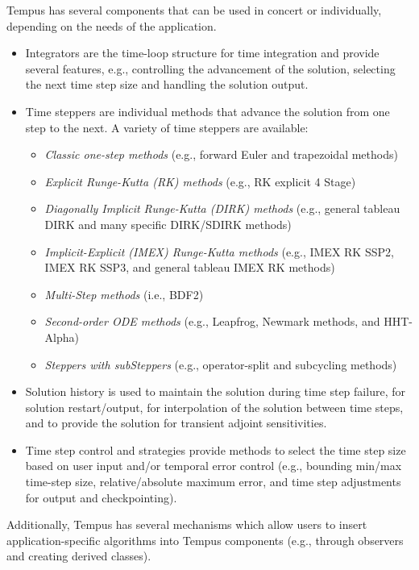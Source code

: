 Tempus has several components that can be used in concert or
individually, depending on the needs of the application.
\begin{itemize}
  \item Integrators are the time-loop structure for time integration
  and provide several features, e.g., controlling the advancement of
  the solution, selecting the next time step size and handling the
  solution output.

  \item Time steppers are individual methods that advance the
  solution from one step to the next.  A variety of time steppers
  are available:
  \begin{itemize}
    \item \emph{Classic one-step methods} (e.g., forward Euler and trapezoidal methods)
    \item \emph{Explicit Runge-Kutta (RK) methods} (e.g., RK explicit 4 Stage)
    \item \emph{Diagonally Implicit Runge-Kutta (DIRK) methods} (e.g.,
    general tableau DIRK and many specific DIRK/SDIRK methods)
    \item \emph{Implicit-Explicit (IMEX) Runge-Kutta methods} (e.g., IMEX
    RK SSP2, IMEX RK SSP3, and general tableau IMEX RK methods)
    \item \emph{Multi-Step methods} (i.e., BDF2)
    \item \emph{Second-order ODE methods} (e.g., Leapfrog, Newmark methods,
    and HHT-Alpha)
    \item \emph{Steppers with subSteppers} (e.g., operator-split and
    subcycling methods)
  \end{itemize}

  \item Solution history is used to maintain the solution during
  time step failure, for solution restart/output, for interpolation of
  the solution between time steps, and to provide the solution for
  transient adjoint sensitivities.

  \item Time step control and strategies provide methods to select
  the time step size based on user input and/or temporal error
  control (e.g., bounding min/max time-step size, relative/absolute
  maximum error, and time step adjustments for output and checkpointing).
\end{itemize}

Additionally, Tempus has several mechanisms which allow users to
insert application-specific algorithms into Tempus components (e.g.,
through observers and creating derived classes).

